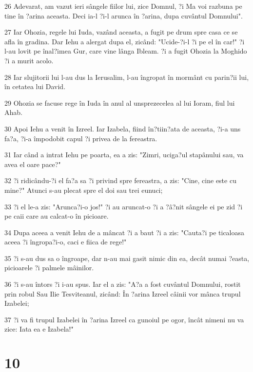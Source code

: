 \par 26 Adevarat, am vazut ieri sângele fiilor lui, zice Domnul, ?i Ma voi razbuna pe tine în ?arina aceasta. Deci ia-l ?i-l arunca în ?arina, dupa cuvântul Domnului".
\par 27 Iar Ohozia, regele lui Iuda, vazând aceasta, a fugit pe drum spre casa ce se afla în gradina. Dar Iehu a alergat dupa el, zicând: "Ucide-?i-l ?i pe el în car!" ?i l-au lovit pe înal?imea Gur, care vine lânga Ibleam. ?i a fugit Ohozia la Moghido ?i a murit acolo.
\par 28 Iar slujitorii lui l-au dus la Ierusalim, l-au îngropat în mormânt cu parin?ii lui, în cetatea lui David.
\par 29 Ohozia se facuse rege în Iuda în anul al unsprezecelea al lui Ioram, fiul lui Ahab.
\par 30 Apoi Iehu a venit în Izreel. Iar Izabela, fiind în?tiin?ata de aceasta, ?i-a uns fa?a, ?i-a împodobit capul ?i privea de la fereastra.
\par 31 Iar când a intrat Iehu pe poarta, ea a zis: "Zimri, uciga?ul stapânului sau, va avea el oare pace?"
\par 32 ?i ridicându-?i el fa?a sa ?i privind spre fereastra, a zis: "Cine, cine este cu mine?" Atunci s-au plecat spre el doi sau trei eunuci;
\par 33 ?i el le-a zis: "Arunca?i-o jos!" ?i au aruncat-o ?i a ?â?nit sângele ei pe zid ?i pe caii care au calcat-o în picioare.
\par 34 Dupa aceea a venit Iehu de a mâncat ?i a baut ?i a zis: "Cauta?i pe ticaloasa aceea ?i îngropa?i-o, caci e fiica de rege!"
\par 35 ?i s-au dus sa o îngroape, dar n-au mai gasit nimic din ea, decât numai ?easta, picioarele ?i palmele mâinilor.
\par 36 ?i s-au întors ?i i-au spus. Iar el a zis: "A?a a fost cuvântul Domnului, rostit prin robul Sau Ilie Tesviteanul, zicând: În ?arina Izreel câinii vor mânca trupul Izabelei;
\par 37 ?i va fi trupul Izabelei în ?arina Izreel ca gunoiul pe ogor, încât nimeni nu va zice: Iata ea e Izabela!"

\chapter{10}

